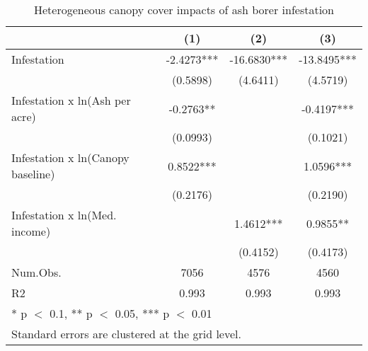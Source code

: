 \begin{table}[!h]

\caption{Heterogeneous canopy cover impacts of ash borer infestation}
\centering
\begin{tabular}[t]{lccc}
\toprule
  & (1) & (2) & (3)\\
\midrule
Infestation & -2.4273*** & -16.6830*** & -13.8495***\\
 & (0.5898) & (4.6411) & (4.5719)\\
Infestation x ln(Ash per acre) & -0.2763** &  & -0.4197***\\
 & (0.0993) &  & (0.1021)\\
Infestation x ln(Canopy baseline) & 0.8522*** &  & 1.0596***\\
 & (0.2176) &  & (0.2190)\\
Infestation x ln(Med. income) &  & 1.4612*** & 0.9855**\\
 &  & (0.4152) & (0.4173)\\
\midrule
Num.Obs. & 7056 & 4576 & 4560\\
R2 & 0.993 & 0.993 & 0.993\\
\bottomrule
\multicolumn{4}{l}{\rule{0pt}{1em}* p $<$ 0.1, ** p $<$ 0.05, *** p $<$ 0.01}\\
\multicolumn{4}{l}{\rule{0pt}{1em}Standard errors are clustered at the grid level.}\\
\end{tabular}
\end{table}
